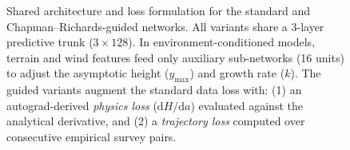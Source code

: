 \documentclass[11pt,a4paper]{report}
\begin{document}

\begin{figure}[!htbp]
\centering
{}
\caption{Shared architecture and loss formulation for the standard and Chapman--Richards-guided networks. All variants share a 3-layer predictive trunk ($3 \times 128$). In environment-conditioned models, terrain and wind features feed only auxiliary sub-networks (16 units) to adjust the asymptotic height ($y_{\max}$) and growth rate ($k$). The guided variants augment the standard data loss with: (1) an autograd-derived \emph{physics loss} ($\mathrm{d}H/\mathrm{d}a$) evaluated against the analytical derivative, and (2) a \emph{trajectory loss} computed over consecutive empirical survey pairs.}
\label{fig:model-architecture}
\end{figure}
\end{document}
